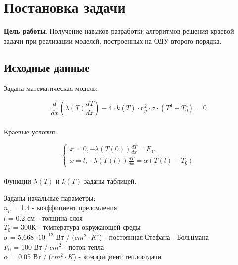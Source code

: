 \documentclass[a4paper,oneside,12pt]{extreport}
\begin{document}


\section{Постановка задачи}
\textbf{Цель работы}. 
Получение навыков разработки алгоритмов решения краевой задачи при
реализации моделей, построенных на ОДУ второго порядка.

\subsection{Исходные данные}

Задана математическая модель:

\begin{equation*}
	\frac{d}{dx}(\lambda(T)\frac{dT}{dx}) - 4 \cdot k(T) \cdot n_{p}^2 \cdot \sigma \cdot (T^4 - T_{0}^4) = 0
\end{equation*}\\

Краевые условия:

\begin{equation*}
	\begin{cases} x = 0, -\lambda(T(0))\frac{dT}{dx} = F_{0}.
	\\ x = l, -\lambda(T(l))\frac{dT}{dx} = \alpha(T(l) - T_{0})
	\end{cases}
\end{equation*}\\

Функции $\lambda(T)$ и $k(T)$ заданы таблицей.\\

\begin{figure}[ht!]
\end{figure}

Заданы начальные параметры:\\
\indent $n_p$ = 1.4 - коэффициент преломления\\
\indent $l$ = 0.2 см - толщина слоя\\
\indent $T_{0}$ = 300К - температура окружающей среды\\
\indent $\sigma$ = 5.668 $\cdot 10^{-12}$ Вт / ($cm^2 \cdot K^4$) - постоянная Стефана - Больцмана\\
\indent $F_{0}$ = 100 Вт / $cm^2$ - поток тепла\\
\indent $\alpha$ = 0.05 Вт / ($cm^2 \cdot K$) - коэффициент теплоотдачи\\
\end{document}
